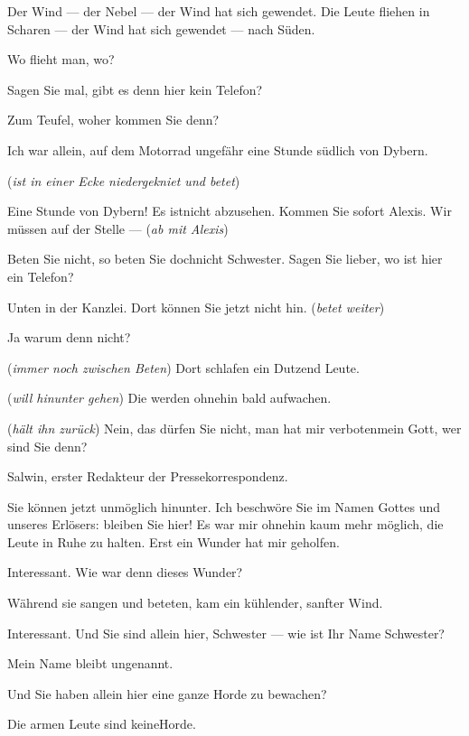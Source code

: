 \documentclass[
	final,
	a4paper,
	ngerman,
	mpinclude = true, %
	twoside = true,
	open = right,
	cleardoublepage = plain,
	DIV = 13,
	BCOR = 1cm,
	titlepage = firstiscover,
	]{scrbook}
\newcommand{\direction}[1]{(\textit{#1})}
\newcommand{\thecharacter}[1]{\textup{\textsc{#1}}\xspace}
\newcommand{\theAlexis}{\thecharacter{Alexis}}
\newcommand{\theSalwin}{\thecharacter{Salwin}}
\newcommand{\character}[1]{\item[#1]}
\newcommand{\Generaldirektor}{\character{Direktor}}
\newcommand{\Alexis}{\character{\theAlexis}}
\newcommand{\Salwin}{\character{\theSalwin}}
\newcommand{\Heilsarmeeschwester}{\character{Schwester}}
\begin{document}
\begin{play}
\Salwin
Der Wind --- der Nebel --- der Wind hat sich gewendet. Die Leute fliehen in Scharen --- der Wind hat sich gewendet --- nach Süden.

\Alexis
Wo flieht man, wo?

\Salwin
Sagen Sie mal, gibt es denn hier kein Telefon?

\Generaldirektor
Zum Teufel, woher kommen Sie denn?

\Salwin
Ich war allein, auf dem Motorrad ungefähr eine Stunde südlich von Dybern.

\Heilsarmeeschwester
\direction{ist in einer Ecke niedergekniet und betet}

\Generaldirektor
Eine Stunde von Dybern! Es istnicht abzusehen. Kommen Sie sofort Alexis. Wir müssen auf der Stelle --- \direction{ab mit Alexis}

\Salwin
Beten Sie nicht, so beten Sie dochnicht Schwester. Sagen Sie lieber, wo ist hier ein Telefon?

\Heilsarmeeschwester
Unten in der Kanzlei. Dort können Sie jetzt nicht hin. \direction{betet weiter}

\Salwin
Ja warum denn nicht?

\Heilsarmeeschwester
\direction{immer noch zwischen Beten} Dort schlafen ein Dutzend Leute.

\Salwin
\direction{will hinunter gehen} Die werden ohnehin bald aufwachen.

\Heilsarmeeschwester
\direction{hält ihn zurück} Nein, das dürfen Sie nicht, man hat mir verbotenmein Gott, wer sind Sie denn?

\Salwin
Salwin, erster Redakteur der Pressekorrespondenz.

\Heilsarmeeschwester
Sie können jetzt unmöglich hinunter. Ich beschwöre Sie im Namen Gottes und unseres Erlösers: bleiben Sie hier! Es war mir ohnehin kaum mehr möglich, die Leute in Ruhe zu halten. Erst ein Wunder hat mir geholfen.

\Salwin
Interessant. Wie war denn dieses Wunder?

\Heilsarmeeschwester
Während sie sangen und beteten, kam ein kühlender, sanfter Wind.

\Salwin
Interessant. Und Sie sind allein hier, Schwester --- wie ist Ihr Name Schwester?

\Heilsarmeeschwester
Mein Name bleibt ungenannt.

\Salwin
Und Sie haben allein hier eine ganze Horde zu bewachen?

\Heilsarmeeschwester
Die armen Leute sind keineHorde.


\end{play}
\end{document}
